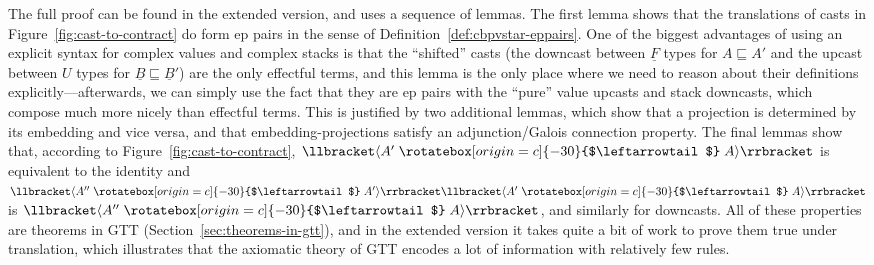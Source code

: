 \documentclass[acmsmall,nonacm]{acmart}
\renewcommand{\u}{\underline}
\newcommand{\sem}[1]{\llbracket#1\rrbracket}
\newcommand{\supcast}[2]{\sem{\upcast{#1}{#2}}}
\newcommand{\ltdyn}{\sqsubseteq}
\newcommand{\uarrow}{\mathrel{\rotatebox[origin=c]{-30}{$\leftarrowtail$}}}
\newcommand{\upcast}[2]{\langle{#2}\uarrow{#1}\rangle}
\begin{document}
\begin{shortonly}
  The full proof can be found in the extended version, and uses a
  sequence of lemmas.  The first lemma shows that the translations of
  casts in Figure~\ref{fig:cast-to-contract} do form ep pairs in the
  sense of Definition~\ref{def:cbpvstar-eppairs}.  One of the biggest
  advantages of using an explicit syntax for complex values and complex
  stacks is that the ``shifted'' casts (the downcast between $\u F$
  types for $A \ltdyn A'$ and the upcast between $U$ types for $\u B
  \ltdyn \u B'$) are the only effectful terms, and this lemma is the
  only place where we need to reason about their definitions
  explicitly---afterwards, we can simply use the fact that they are ep
  pairs with the ``pure'' value upcasts and stack downcasts, which
  compose much more nicely than effectful terms.  This is justified by two
  additional lemmas, which show that a projection is determined
  by its embedding and vice versa, and that embedding-projections
  satisfy an adjunction/Galois connection property.  The final lemmas
  show that, according to Figure~\ref{fig:cast-to-contract},
  $\supcast{A}{A'}$ is equivalent to the identity and
  $\supcast{A'}{A''}\supcast{A}{A'}$ is $\supcast{A}{A''}$, and
  similarly for downcasts.  All of these properties are theorems in GTT
  (Section~\ref{sec:theorems-in-gtt}), and in the extended version it
  takes quite a bit of work to prove them true under translation, which
  illustrates that the axiomatic theory of GTT encodes a lot of
  information with relatively few rules.
\end{shortonly}
\end{document}
